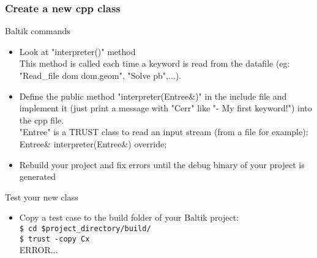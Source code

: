 \documentclass[10pt, hyperref={unicode=true,pdfusetitle, bookmarks=true,bookmarksnumbered=false,bookmarksopen=false, breaklinks=false,pdfborder={0 0 1},backref=true,colorlinks=true,linkcolor=darkblue,pageanchor, urlcolor=darkblue}]{beamer}
\begin{document}
\begin{frame}
\frametitle{Create a new cpp class}
\begin{block}{Baltik commands}

\begin{itemize}
\item Look at "interpreter()" method \\ %
 This method is called each time a keyword is read from the datafile (eg: "Read\_file dom dom.geom", "Solve pb",...).

\item Define the public method "interpreter(Entree\&)" in the include file and implement it
(just print a message with "Cerr" like "- My first keyword!") into the cpp file. \\
"Entree" is a TRUST class to read an input stream (from a file for example):\\
Entree\& interpreter(Entree\&) override;

\item Rebuild your project and fix errors until the debug binary of your project is generated
\end{itemize}
\end{block}

\begin{block}{Test your new class}
\begin{itemize}
\item Copy a test case to the build folder of your Baltik project:\\
\texttt{\$ cd \$project\_directory/build/}\\
\texttt{\$ trust -copy Cx}\\
ERROR...

\end{itemize}
\end{block}
\end{frame}
\end{document}
